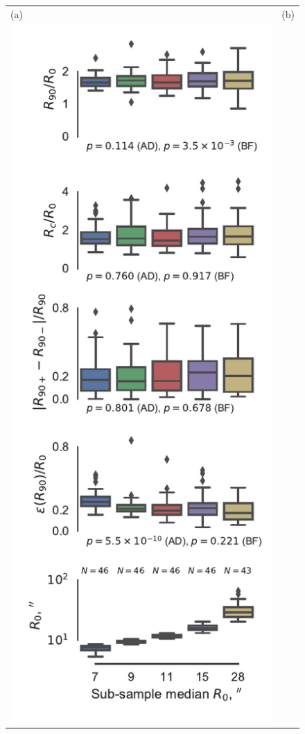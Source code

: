 \begin{figure}
  \centering
  \setlength\tabcolsep{0pt}
  \begin{tabular}{ll}
    (a) & (b) \\
    \includegraphics[height=1.167\linewidth]
    {figs/mipsgal-boxplot-Rc-R90-versus-R0}
        & \includegraphics[height=1.167\linewidth]

\end{tabular}
\end{figure}
